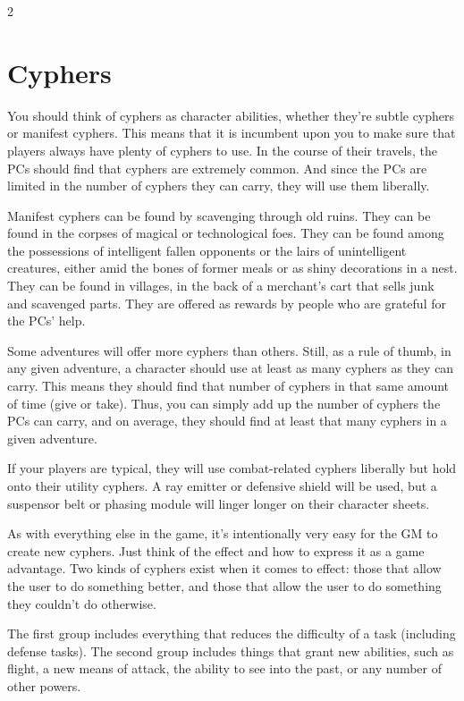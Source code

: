 \begin{multicols}{2}
\chapter{Cyphers}

You should think of cyphers as character abilities, whether they’re subtle cyphers or manifest cyphers. This means that it is incumbent upon you to make sure that players always have plenty of cyphers to use. In the course of their travels, the PCs should find that cyphers are extremely common. And since the PCs are limited in the number of cyphers they can carry, they will use them liberally.

Manifest cyphers can be found by scavenging through old ruins. They can be found in the corpses of magical or technological foes. They can be found among the possessions of intelligent fallen opponents or the lairs of unintelligent creatures, either amid the bones of former meals or as shiny decorations in a nest. They can be found in villages, in the back of a merchant’s cart that sells junk and scavenged parts. They are offered as rewards by people who are grateful for the PCs’ help.

Some adventures will offer more cyphers than others. Still, as a rule of thumb, in any given adventure, a character should use at least as many cyphers as they can carry. This means they should find that number of cyphers in that same amount of time (give or take). Thus, you can simply add up the number of cyphers the PCs can carry, and on average, they should find at least that many cyphers in a given adventure.

If your players are typical, they will use combat-related cyphers liberally but hold onto their utility cyphers. A ray emitter or defensive shield will be used, but a suspensor belt or phasing module will linger longer on their character sheets.

As with everything else in the game, it’s intentionally very easy for the GM to create new cyphers. Just think of the effect and how to express it as a game advantage. Two kinds of cyphers exist when it comes to effect: those that allow the user to do something better, and those that allow the user to do something they couldn’t do otherwise.

The first group includes everything that reduces the difficulty of a task (including defense tasks). The second group includes things that grant new abilities, such as flight, a new means of attack, the ability to see into the past, or any number of other powers.


\end{multicols}
